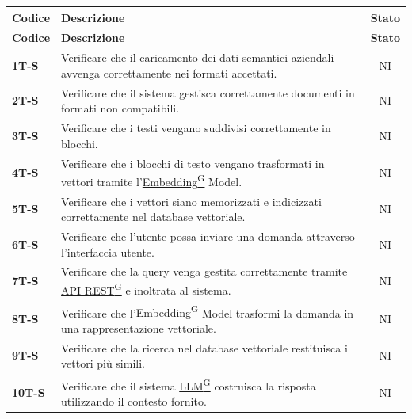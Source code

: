 \documentclass{article}
\begin{document}
\begin{longtable}{|>{\centering\arraybackslash}m{}|>{\raggedright\arraybackslash}m{}|c|}
    \hline
    \textbf{Codice} & \textbf{Descrizione} & \textbf{Stato} \\
    \hline
    \endfirsthead
    \hline
    \textbf{Codice} & \textbf{Descrizione} & \textbf{Stato} \\
    \hline
    \endhead
    \hline
    \endfoot
    \hline
    \textbf{1T-S} & Verificare che il caricamento dei dati semantici aziendali avvenga correttamente nei formati accettati. & NI \\
    \hline
    \textbf{2T-S} & Verificare che il sistema gestisca correttamente documenti in formati non compatibili. & NI \\
    \hline
    \textbf{3T-S} & Verificare che i testi vengano suddivisi correttamente in blocchi. & NI \\
    \hline
    \textbf{4T-S} & Verificare che i blocchi di testo vengano trasformati in vettori tramite l’\href{https://code7crusaders.github.io/docs/RTB/documentazione_interna/glossario.html#embedding}{Embedding\textsuperscript{G}} Model. & NI \\
    \hline
    \textbf{5T-S} & Verificare che i vettori siano memorizzati e indicizzati correttamente nel database vettoriale. & NI \\
    \hline
    \textbf{6T-S} & Verificare che l’utente possa inviare una domanda attraverso l’interfaccia utente. & NI \\
    \hline
    \textbf{7T-S} & Verificare che la query venga gestita correttamente tramite \href{https://code7crusaders.github.io/docs/RTB/documentazione_interna/glossario.html#api-rest-representational-state-transfer}{API REST\textsuperscript{G}} e inoltrata al sistema. & NI \\
    \hline
    \textbf{8T-S} & Verificare che l’\href{https://code7crusaders.github.io/docs/RTB/documentazione_interna/glossario.html#embedding}{Embedding\textsuperscript{G}} Model trasformi la domanda in una rappresentazione vettoriale. & NI \\
    \hline
    \textbf{9T-S} & Verificare che la ricerca nel database vettoriale restituisca i vettori più simili. & NI \\
    \hline
    \textbf{10T-S} & Verificare che il sistema \href{https://code7crusaders.github.io/docs/RTB/documentazione_interna/glossario.html#llm-large-language-model}{LLM\textsuperscript{G}} costruisca la risposta utilizzando il contesto fornito. & NI \\

\end{longtable}
\end{document}

